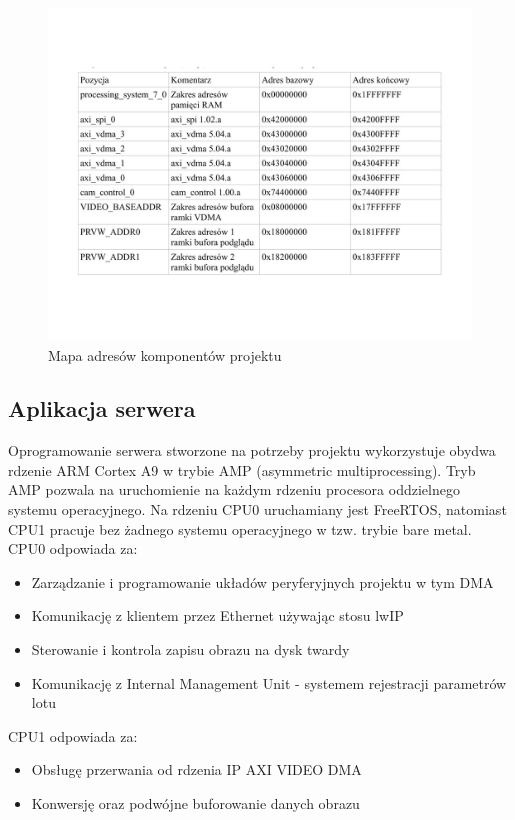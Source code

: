 \documentclass[a4paper,11pt,oneside]{report}  %
\begin{document}
\begin{figure}[H]
	\centering
	\includegraphics[width=16cm]{data8.png}
	\caption{Mapa adresów komponentów projektu}
	\label{fig:Zynq8}
\end{figure}

\subsection{Aplikacja serwera}

Oprogramowanie serwera stworzone na potrzeby projektu wykorzystuje obydwa rdzenie ARM Cortex A9 w trybie AMP (asymmetric multiprocessing). Tryb AMP pozwala na uruchomienie na każdym rdzeniu procesora oddzielnego systemu operacyjnego. Na rdzeniu CPU0 uruchamiany jest FreeRTOS, natomiast CPU1 pracuje bez żadnego systemu operacyjnego w tzw. trybie bare metal.
CPU0 odpowiada za:
\begin{itemize} 
\item Zarządzanie i programowanie układów peryferyjnych projektu w tym DMA 
\item Komunikację z klientem przez Ethernet używając stosu lwIP 
\item Sterowanie i kontrola zapisu obrazu na dysk twardy 
\item Komunikację z Internal Management Unit - systemem rejestracji parametrów lotu
\end{itemize}
CPU1 odpowiada za: 
\begin{itemize}
\item Obsługę przerwania od rdzenia IP AXI VIDEO DMA  
\item Konwersję oraz podwójne buforowanie danych obrazu
\end{itemize}
\end{document}
